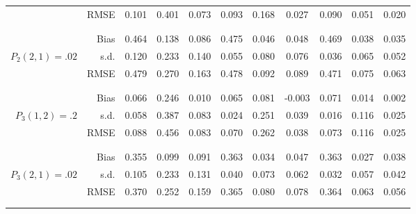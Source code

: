 \begin{tabular}{rr@{\hskip .3in}ccc@{\hskip .4in}ccc@{\hskip .4in}ccc}
&RMSE & 0.101&0.401&0.073&0.093&0.168&0.027&0.090&0.051&0.020 \\
\\\\&Bias & 0.464&0.138&0.086&0.475&0.046&0.048&0.469&0.038&0.035 \\
$ P_{2}(2,1)=.02 $& s.d. & 0.120&0.233&0.140&0.055&0.080&0.076&0.036&0.065&0.052 \\
&RMSE & 0.479&0.270&0.163&0.478&0.092&0.089&0.471&0.075&0.063 \\
\\\\&Bias & 0.066&0.246&0.010&0.065&0.081&-0.003&0.071&0.014&0.002 \\
$ P_{3}(1,2)=.2 $& s.d. & 0.058&0.387&0.083&0.024&0.251&0.039&0.016&0.116&0.025 \\
&RMSE & 0.088&0.456&0.083&0.070&0.262&0.038&0.073&0.116&0.025 \\
\\\\&Bias & 0.355&0.099&0.091&0.363&0.034&0.047&0.363&0.027&0.038 \\
$ P_{3}(2,1)=.02 $& s.d. & 0.105&0.233&0.131&0.040&0.073&0.062&0.032&0.057&0.042 \\
&RMSE & 0.370&0.252&0.159&0.365&0.080&0.078&0.364&0.063&0.056 \\
\\\\\end{tabular}